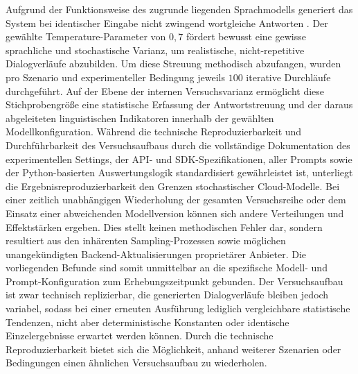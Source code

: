 Aufgrund der Funktionsweise des zugrunde liegenden Sprachmodells generiert das System bei identischer Eingabe nicht zwingend wortgleiche Antworten \citep{vaswani2017attention}. Der gewählte Temperature-Parameter von $0{,}7$ fördert bewusst eine gewisse sprachliche und stochastische Varianz, um realistische, nicht-repetitive Dialogverläufe abzubilden. Um diese Streuung methodisch abzufangen, wurden pro Szenario und experimenteller Bedingung jeweils $100$ iterative Durchläufe durchgeführt. Auf der Ebene der internen Versuchsvarianz ermöglicht diese Stichprobengröße eine statistische Erfassung der Antwortstreuung und der daraus abgeleiteten linguistischen Indikatoren innerhalb der gewählten Modellkonfiguration. 
Während die technische Reproduzierbarkeit und Durchführbarkeit des Versuchsaufbaus durch die vollständige Dokumentation des experimentellen Settings, der API- und SDK-Spezifikationen, aller Prompts sowie der Python-basierten Auswertungslogik standardisiert gewährleistet ist, unterliegt die Ergebnisreproduzierbarkeit den Grenzen stochastischer Cloud-Modelle. Bei einer zeitlich unabhängigen Wiederholung der gesamten Versuchsreihe oder dem Einsatz einer abweichenden Modellversion können sich andere Verteilungen und Effektstärken ergeben. Dies stellt keinen methodischen Fehler dar, sondern resultiert aus den inhärenten Sampling-Prozessen sowie möglichen unangekündigten Backend-Aktualisierungen proprietärer Anbieter. Die vorliegenden Befunde sind somit unmittelbar an die spezifische Modell- und Prompt-Konfiguration zum Erhebungszeitpunkt gebunden. Der Versuchsaufbau ist zwar technisch replizierbar, die generierten Dialogverläufe bleiben jedoch variabel, sodass bei einer erneuten Ausführung lediglich vergleichbare statistische Tendenzen, nicht aber deterministische Konstanten oder identische Einzelergebnisse erwartet werden können.
Durch die technische Reproduzierbarkeit bietet sich die Möglichkeit, anhand weiterer Szenarien oder Bedingungen einen ähnlichen Versuchsaufbau zu wiederholen.


